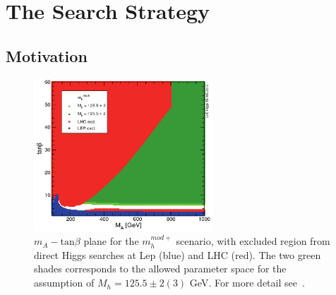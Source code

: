 

\clearpage

\section{The Search Strategy}
\label{sec:strategy}

\subsection{Motivation}

\begin{figure}[tp]
     \begin{center}

            \includegraphics[width=0.6\textwidth]{figure/mh_mod.png}

    \end{center}
    \caption{$m_{A} - \text{tan}\beta$ plane for the  $m_{h}^{mod+}$ scenario, with excluded region
	from direct Higgs searches at Lep (blue) and LHC (red). The two green shades corresponds to
	the allowed parameter space for the assumption of $M_{h} = 125.5 \pm 2 (3)$ GeV. For more detail 
	see~\cite{}.}
   \label{fig:mhmod}
\end{figure}

